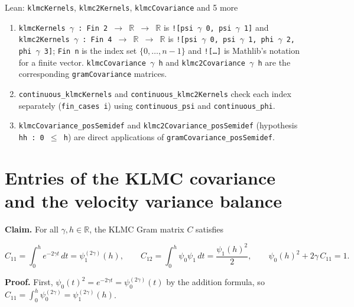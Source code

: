 \documentclass[11pt,a4paper]{article}
\begin{document}
\begin{leanbox}{Lean: \texttt{klmcKernels}, \texttt{klmc2Kernels}, \texttt{klmcCovariance} and 5 more}
\begin{enumerate}
\item \texttt{klmc\allowbreak{}Kernels \ensuremath{\gamma} : Fin 2 \ensuremath{\to} \ensuremath{\mathbb R} \ensuremath{\to} \ensuremath{\mathbb R}} is \texttt{![psi \ensuremath{\gamma} 0, psi \ensuremath{\gamma} 1]} and \texttt{klmc2\allowbreak{}Kernels \ensuremath{\gamma} : Fin 4 \ensuremath{\to} \ensuremath{\mathbb R} \ensuremath{\to} \ensuremath{\mathbb R}} is \texttt{![psi \ensuremath{\gamma} 0, psi \ensuremath{\gamma} 1, phi \ensuremath{\gamma} 2, phi \ensuremath{\gamma} 3]}; \texttt{Fin n} is the index set \(\{0,\dots,n-1\}\) and \texttt{![…]} is Mathlib's notation for a finite vector. \texttt{klmc\allowbreak{}Covariance \ensuremath{\gamma} h} and \texttt{klmc2\allowbreak{}Covariance \ensuremath{\gamma} h} are the corresponding \texttt{gram\allowbreak{}Covariance} matrices.

\item \texttt{continuous\_\allowbreak{}klmc\allowbreak{}Kernels} and \texttt{continuous\_\allowbreak{}klmc2\allowbreak{}Kernels} check each index separately (\texttt{fin\_\allowbreak{}cases i}) using \texttt{continuous\_\allowbreak{}psi} and \texttt{continuous\_\allowbreak{}phi}.

\item \texttt{klmc\allowbreak{}Covariance\_\allowbreak{}pos\allowbreak{}Semidef} and \texttt{klmc2\allowbreak{}Covariance\_\allowbreak{}pos\allowbreak{}Semidef} (hypothesis \texttt{hh : 0 \ensuremath{\le} h}) are direct applications of \texttt{gram\allowbreak{}Covariance\_\allowbreak{}pos\allowbreak{}Semidef}.

\end{enumerate}
\end{leanbox}

\section{\texorpdfstring{Entries of the KLMC covariance and the velocity variance balance}{Entries of the KLMC covariance and the velocity variance balance}}


\textbf{Claim.} For all \(\gamma,h\in\mathbb R\), the KLMC Gram matrix \(C\) satisfies


\[C_{11}=\int_0^he^{-2\gamma t}\,dt=\psi_1^{(2\gamma)}(h),\qquad C_{12}=\int_0^h\psi_0\psi_1\,dt=\frac{\psi_1(h)^2}{2},\qquad\psi_0(h)^2+2\gamma\,C_{11}=1 .\]


\textbf{Proof.} First, \(\psi_0(t)^2=e^{-2\gamma t}=\psi_0^{(2\gamma)}(t)\) by the addition formula, so \(C_{11}=\int_0^h\psi_0^{(2\gamma)}=\psi_1^{(2\gamma)}(h)\).
\end{document}
